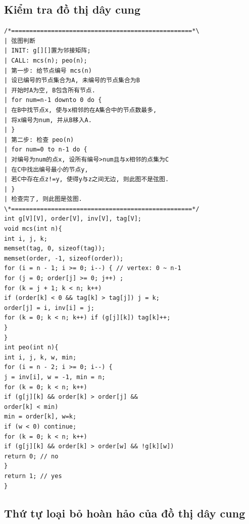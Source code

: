 \documentclass[11pt]{article}
\begin{document}
\subsection{Kiểm tra đồ thị dây cung}

\begingroup
\scriptsize
\begin{verbatim}
/*==================================================*\
| 弦图判断
| INIT: g[][]置为邻接矩阵;
| CALL: mcs(n); peo(n);
| 第一步: 给节点编号 mcs(n)
| 设已编号的节点集合为A, 未编号的节点集合为B
| 开始时A为空, B包含所有节点.
| for num=n-1 downto 0 do {
| 在B中找节点x, 使与x相邻的在A集合中的节点数最多,
| 将x编号为num, 并从B移入A.
| }
| 第二步: 检查 peo(n)
| for num=0 to n-1 do {
| 对编号为num的点x, 设所有编号>num且与x相邻的点集为C
| 在C中找出编号最小的节点y,
| 若C中存在点z!=y, 使得y与z之间无边, 则此图不是弦图.
| }
| 检查完了, 则此图是弦图.
\*==================================================*/
int g[V][V], order[V], inv[V], tag[V];
void mcs(int n){
int i, j, k;
memset(tag, 0, sizeof(tag));
memset(order, -1, sizeof(order));
for (i = n - 1; i >= 0; i--) { // vertex: 0 ~ n-1
for (j = 0; order[j] >= 0; j++) ;
for (k = j + 1; k < n; k++)
if (order[k] < 0 && tag[k] > tag[j]) j = k;
order[j] = i, inv[i] = j;
for (k = 0; k < n; k++) if (g[j][k]) tag[k]++;
}
}
int peo(int n){
int i, j, k, w, min;
for (i = n - 2; i >= 0; i--) {
j = inv[i], w = -1, min = n;
for (k = 0; k < n; k++)
if (g[j][k] && order[k] > order[j] &&
order[k] < min)
min = order[k], w=k;
if (w < 0) continue;
for (k = 0; k < n; k++)
if (g[j][k] && order[k] > order[w] && !g[k][w])
return 0; // no
}
return 1; // yes
}
\end{verbatim}
\endgroup

\subsection{Thứ tự loại bỏ hoàn hảo của đồ thị dây cung}
\end{document}
